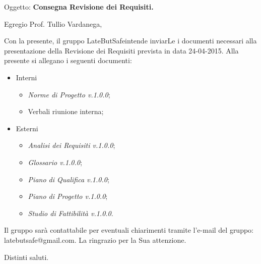\documentclass{letter}
\makeatletter
\newcommand{\AnalisiDeiRequisiti}{\textit{Analisi dei Requisiti v.1.0.0}}
\newcommand{\PianoDiProgetto}{\textit{Piano di Progetto v.1.0.0}}
\newcommand{\NormeDiProgetto}{\textit{Norme di Progetto v.1.0.0}}
\newcommand{\PianoDiQualifica}{\textit{Piano di Qualifica v.1.0.0}}
\newcommand{\Glossario}{\textit{Glossario v.1.0.0}}
\newcommand{\StudioDiFattibilita}{\textit{Studio di Fattibilità v.1.0.0}}
\newcommand{\gruppo}{LateButSafe}
\newcommand{\mail}{latebutsafe@gmail.com}
\newcommand{\Vardanega}{Prof. Tullio Vardanega}
\makeatother
\begin{document}
	
	\begin{letter}{Oggetto: \textbf{Consegna Revisione dei Requisiti.}}
	\opening {Egregio \Vardanega ,}
	Con la presente, il gruppo \gruppo intende inviarLe i documenti necessari alla presentazione della Revisione dei Requisiti prevista in data 24-04-2015.
	Alla presente si allegano i seguenti documenti:
			\begin{itemize}
				\item Interni
					\begin{itemize}
						\item \NormeDiProgetto;
						\item Verbali riunione interna;						
					\end{itemize}
				\item Esterni
					\begin{itemize}
						\item \AnalisiDeiRequisiti;
						\item \Glossario;
						\item \PianoDiQualifica;
						\item \PianoDiProgetto;
						\item \StudioDiFattibilita.
					\end{itemize}
			\end{itemize} 
		Il gruppo sarà  contattabile per eventuali chiarimenti tramite l'e-mail del gruppo: \mail. La ringrazio per la Sua attenzione.
		
		\thispagestyle{fancy}
		\closing{Distinti saluti.}

   \end{letter}
\end{document}
